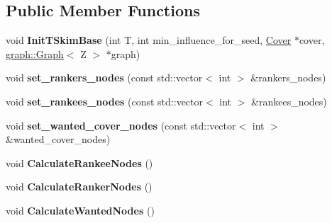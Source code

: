 \subsection*{Public Member Functions}
\begin{DoxyCompactItemize}
\item 
\hypertarget{classall__distance__sketch_1_1TSkimBase_a8b5f182c267f0f0479c9c660c70fd730}{}void {\bfseries Init\+T\+Skim\+Base} (int T, int min\+\_\+influence\+\_\+for\+\_\+seed, \hyperlink{classall__distance__sketch_1_1Cover}{Cover} $\ast$cover, \hyperlink{classall__distance__sketch_1_1graph_1_1Graph}{graph\+::\+Graph}$<$ Z $>$ $\ast$graph)\label{classall__distance__sketch_1_1TSkimBase_a8b5f182c267f0f0479c9c660c70fd730}

\item 
\hypertarget{classall__distance__sketch_1_1TSkimBase_a0accb1c413d88a969cd94b367fa928f3}{}void {\bfseries set\+\_\+rankers\+\_\+nodes} (const std\+::vector$<$ int $>$ \&rankers\+\_\+nodes)\label{classall__distance__sketch_1_1TSkimBase_a0accb1c413d88a969cd94b367fa928f3}

\item 
\hypertarget{classall__distance__sketch_1_1TSkimBase_a8081d78cabc70bd2a0c8d1cbeef1d922}{}void {\bfseries set\+\_\+rankees\+\_\+nodes} (const std\+::vector$<$ int $>$ \&rankees\+\_\+nodes)\label{classall__distance__sketch_1_1TSkimBase_a8081d78cabc70bd2a0c8d1cbeef1d922}

\item 
\hypertarget{classall__distance__sketch_1_1TSkimBase_a57a9bdc61418a76d97728285f19173f8}{}void {\bfseries set\+\_\+wanted\+\_\+cover\+\_\+nodes} (const std\+::vector$<$ int $>$ \&wanted\+\_\+cover\+\_\+nodes)\label{classall__distance__sketch_1_1TSkimBase_a57a9bdc61418a76d97728285f19173f8}

\item 
\hypertarget{classall__distance__sketch_1_1TSkimBase_a0f6bdc9626337dc24f8bc9295760bd0e}{}void {\bfseries Calculate\+Rankee\+Nodes} ()\label{classall__distance__sketch_1_1TSkimBase_a0f6bdc9626337dc24f8bc9295760bd0e}

\item 
\hypertarget{classall__distance__sketch_1_1TSkimBase_a30b184f9cd5cb27de3ef041b70cb90a6}{}void {\bfseries Calculate\+Ranker\+Nodes} ()\label{classall__distance__sketch_1_1TSkimBase_a30b184f9cd5cb27de3ef041b70cb90a6}

\item 
\hypertarget{classall__distance__sketch_1_1TSkimBase_a3adf0e3599cacf4f31e512c3316069b6}{}void {\bfseries Calculate\+Wanted\+Nodes} ()\label{classall__distance__sketch_1_1TSkimBase_a3adf0e3599cacf4f31e512c3316069b6}


\end{DoxyCompactItemize}

